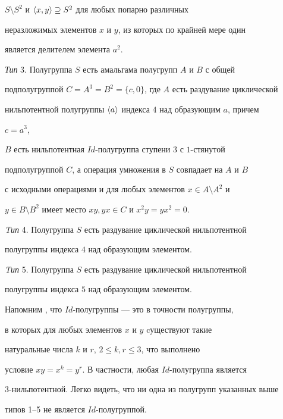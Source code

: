 $S\setminus S^2$ и $\langle x, y\rangle \supseteq S^2$ для любых попарно различных


неразложимых элементов $x$ и $y$, из которых по крайней мере один


является делителем элемента $a^2$.





{\it Тип} 3. Полугруппа $S$ есть амальгама полугрупп $A$ и $B$ с общей


подполугруппой $C=A^3=B^2=\{c,0\}$, где $A$ есть раздувание циклической


нильпотентной полугруппы $\langle  a\rangle$ индекса $4$ над образующим $a$, причем


$c=a^3$,


$B$ есть нильпотентная $Id$-полугруппа ступени $3$ с $1$-стянутой


подполугруппой $C$, а операция умножения в $S$ совпадает на $A$ и $B$


с исходными операциями и для любых элементов $x\in A\setminus A^2$ и


$y\in B\setminus B^2$ имеет место $xy, yx \in C$ и $x^2y=yx^2=0$.





{\it Tип} 4. Полугруппа $S$ есть раздувание циклической нильпотентной


полугруппы индекса $4$ над образующим элементом.





{\it Tип} 5. Полугруппа $S$ есть раздувание циклической нильпотентной


полугруппы индекса $5$ над образующим элементом.





Напомним \cite{1}, что $Id$-полугруппы --- это в точности полугруппы,


в которых для любых элементов $x$ и $y$ cуществуют такие


натуральные числа $k$ и $r$, $2\le k,r\le 3$, что выполнено


условие $xy = x^k = y^r$. В частности, любая $Id$-полугруппа является


$3$-нильпотентной. Легко видеть, что ни одна из полугрупп указанных выше


типов 1--5 не является $Id$-полугруппой.






